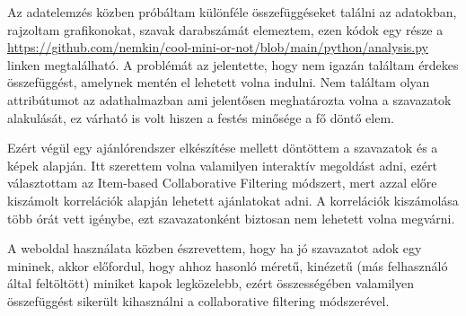 \documentclass[14pt,a4paper]{article}
\begin{document}
Az adatelemzés közben próbáltam különféle összefüggéseket találni az adatokban, rajzoltam grafikonokat, szavak
darabszámát elemeztem, ezen kódok egy része a
\href{https://github.com/nemkin/cool-mini-or-not/blob/main/python/analysis.py}{\url{https://github.com/nemkin/cool-mini-or-not/blob/main/python/analysis.py}}
linken megtalálható. A problémát az jelentette, hogy nem igazán találtam érdekes összefüggést, amelynek mentén el
lehetett volna indulni. Nem találtam olyan attribútumot az adathalmazban ami jelentősen meghatározta volna
a szavazatok alakulását, ez várható is volt hiszen a festés minősége a fő döntő elem.

Ezért végül egy ajánlórendszer elkészítése mellett döntöttem a szavazatok és a képek alapján. Itt szerettem volna
valamilyen interaktív megoldást adni, ezért választottam az Item-based Collaborative Filtering módszert, mert azzal
előre kiszámolt korrelációk alapján lehetett ajánlatokat adni. A korrelációk kiszámolása több órát vett igénybe,
ezt szavazatonként biztosan nem lehetett volna megvárni.

A weboldal használata közben észrevettem, hogy ha jó szavazatot adok egy mininek, akkor előfordul, hogy ahhoz hasonló
méretű, kinézetű (más felhasználó által feltöltött) miniket kapok legközelebb, ezért összességében valamilyen
összefüggést sikerült kihasználni a collaborative filtering módszerével.



\end{document}

